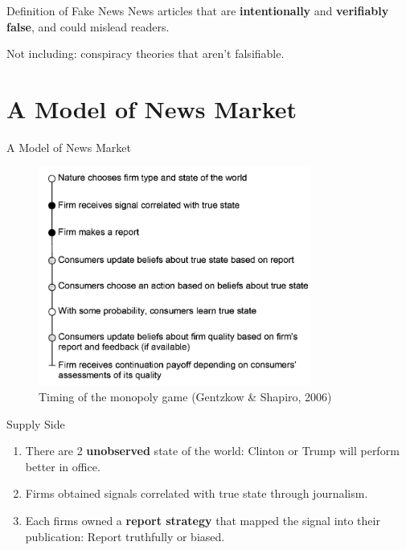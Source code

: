 \documentclass[
  10pt,
  ignorenonframetext,
  aspectratio=43,
]{beamer}
\providecommand{\tightlist}{%
  \setlength{\itemsep}{0pt}\setlength{\parskip}{0pt}}
\begin{document}
\begin{frame}{Definition of Fake News}
\protect\hypertarget{definition-of-fake-news}{}
News articles that are \textbf{intentionally} and \textbf{verifiably
false}, and could mislead readers.

Not including: conspiracy theories that aren't falsifiable.
\end{frame}

\hypertarget{a-model-of-news-market}{%
\section{A Model of News Market}\label{a-model-of-news-market}}

\begin{frame}{A Model of News Market}
\begin{figure}
\centering
\includegraphics[width=0.8\textwidth,height=\textheight]{20220315-allcott-gentzkow-2016-election-fake-news.assets/image-20220314191927957.png}
\caption{Timing of the monopoly game (Gentzkow \& Shapiro, 2006)}
\end{figure}
\end{frame}

\begin{frame}{Supply Side}
\protect\hypertarget{supply-side}{}
\begin{enumerate}
\tightlist
\item
  There are 2 \textbf{unobserved} state of the world: Clinton or Trump
  will perform better in office.
\item
  Firms obtained signals correlated with true state through journalism.
\item
  Each firms owned a \textbf{report strategy} that mapped the signal
  into their publication: Report truthfully or biased.
\end{enumerate}
\end{frame}
\end{document}
